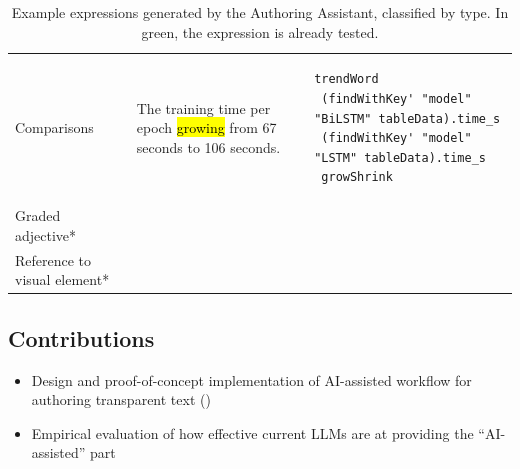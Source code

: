 \begin{table}[!ht]
\begin{tabular}{>{\raggedright\arraybackslash}p{2cm} >{\raggedright\arraybackslash}p{5cm} >{\raggedright\arraybackslash}p{6cm}}
        Comparisons
        & The training time per epoch \hl{growing} from 67 seconds to 106 seconds. &
        \vspace{-5pt}
        \begin{lstlisting}[language=Fluid,numbers=none]
trendWord
 (findWithKey' "model" "BiLSTM" tableData).time_s
 (findWithKey' "model" "LSTM" tableData).time_s
 growShrink
        \end{lstlisting} \\
        Graded adjective*            & ~                & ~                             \\
        Reference to visual element*                            & ~                & ~                             \\
        \bottomrule
    \end{tabular}
    \caption{Example expressions generated by the Authoring Assistant, classified by type. In green, the expression is already tested.}
    \label{tab:fluid_examples}
    \renewcommand{\arraystretch}{1.0}
\end{table}
\subsection{Contributions}

\begin{itemize}
    \item Design and proof-of-concept implementation of AI-assisted workflow for authoring transparent text
    ()
    \item Empirical evaluation of how effective current LLMs are at providing the ``AI-assisted'' part
\end{itemize}
